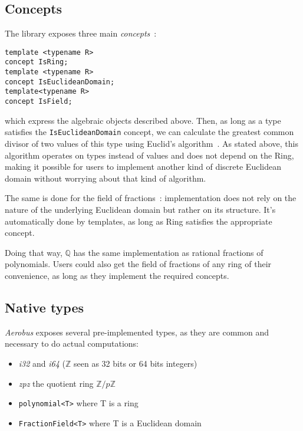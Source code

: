 \documentclass[twocolumn, switch]{article}
\begin{document}
\subsection{Concepts}

The library exposes three main \textit{concepts}~:

\begin{lstlisting}
template <typename R>
concept IsRing;
template <typename R>
concept IsEuclideanDomain;
template<typename R>
concept IsField;
\end{lstlisting}

which express the algebraic objects described above. Then, as long as a type satisfies the \lstinline{IsEuclideanDomain} concept, we can calculate the greatest common divisor of two values of this type using Euclid's algorithm~\cite{heath1956thirteen}. As stated above, this algorithm operates on types instead of values and does not depend on the Ring, making it possible for users to implement another kind of discrete Euclidean domain without worrying about that kind of algorithm.

The same is done for the field of fractions~: implementation does not rely on the nature of the underlying Euclidean domain but rather on its structure. It's automatically done by templates, as long as Ring satisfies the appropriate concept.

Doing that way, $\mathbb{Q}$ has the same implementation as rational fractions of polynomials. Users could also get the field of fractions of any ring of their convenience, as long as they implement the required concepts.

\subsection{Native types}

\textit{Aerobus} exposes several pre-implemented types, as they are common and necessary to do actual computations:

\begin{itemize}
\item \textit{i32} and \textit{i64} ($\mathbb{Z}$ seen as 32 bits or 64 bits integers)
\item \textit{zpz} the quotient ring $\mathbb{Z}/p\mathbb{Z}$
\item \lstinline{polynomial<T>} where T is a ring
\item \lstinline{FractionField<T>} where T is a Euclidean domain
\end{itemize}
\end{document}
